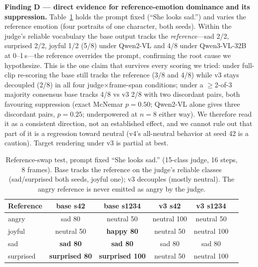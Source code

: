 \documentclass[10pt,twocolumn]{article}
\begin{document}
\textbf{Finding D --- direct evidence for reference-emotion dominance and its suppression.}
Table~\ref{tab:mechanism} holds the prompt fixed (``She looks sad.'') and varies the reference
emotion (four portraits of one character, both seeds). Within the judge's reliable vocabulary the
base output tracks the \emph{reference}---sad 2/2, surprised 2/2, joyful 1/2 (5/8) under Qwen2-VL
and 4/8 under Qwen3-VL-32B at 0--1\,s---the reference overrides the prompt, confirming the root cause
we hypothesize. This is the one claim that survives every scoring we tried: under full-clip
re-scoring the base still tracks the reference (3/8 and 4/8) while v3 stays decoupled (2/8) in all
four judge$\times$frame-span conditions; under a $\ge$2-of-3 majority consensus base tracks 4/8 vs
v3 2/8 with two discordant pairs, both favouring suppression (exact McNemar $p{=}0.50$; Qwen2-VL alone
gives three discordant pairs, $p{=}0.25$; underpowered at $n{=}8$ either way). We therefore read it as a consistent direction, not an
established effect, and we cannot rule out that part of it is a regression toward neutral (v4's
all-neutral behavior at seed 42 is a caution). Target rendering under v3 is partial at best.

\begin{table}[!t]
\centering\small
\caption{Reference-swap test, prompt fixed ``She looks sad.'' (15-class judge, 16 steps, 8
frames). Base tracks the reference on the judge's reliable classes (sad/surprised both seeds,
joyful one); v3 decouples (mostly neutral). The angry reference is never emitted as angry by the
judge.}
\label{tab:mechanism}
\begin{tabular}{@{}lccccc@{}}
\toprule
Reference & base s42 & base s1234 & v3 s42 & v3 s1234\\
\midrule
angry & sad 80 & neutral 50 & neutral 100 & neutral 50\\
joyful & neutral 50 & \textbf{happy 80} & neutral 50 & neutral 100\\
sad & \textbf{sad 80} & \textbf{sad 80} & sad 80 & sad 80\\
surprised & \textbf{surprised 80} & \textbf{surprised 100} & neutral 50 & neutral 100\\
\bottomrule
\end{tabular}
\end{table}
\end{document}
